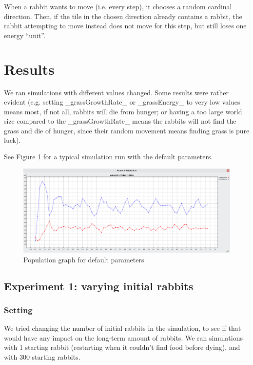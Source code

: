 \documentclass[11pt]{article}
\begin{document}
When a rabbit wants to move (i.e. every step), it chooses a random cardinal direction. Then, if the tile in the chosen direction already contains a rabbit, the rabbit attempting to move instead does not move for this step, but still loses one energy ``unit''.


\section{Results}
We ran simulations with different values changed. Some results were rather evident (e.g. setting _grassGrowthRate_ or _grassEnergy_ to very low values means most, if not all, rabbits will die from hunger; or having a too large world size compared to the _grassGrowthRate_ means the rabbits will not find the grass and die of hunger, since their random movement means finding grass is pure luck).

See Figure \ref{fig:default} for a typical simulation run with the default parameters.

\begin{figure}[h]
	\includegraphics[width=\textwidth]{default}
	\caption{Population graph for default parameters}
	\label{fig:default}
\end{figure}

\subsection{Experiment 1: varying initial rabbits}

\subsubsection{Setting}
We tried changing the number of initial rabbits in the simulation, to see if that would have any impact on the long-term amount of rabbits. We ran simulations with 1 starting rabbit (restarting when it couldn't find food before dying), and with 300 starting rabbits.
\end{document}
